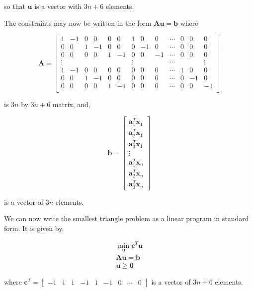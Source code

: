 \documentclass{article}
\begin{document}
\noindent so that $\mathbf{u}$ is a vector with $3n + 6$ elements.

The constraints may now be written in the form $\mathbf{A} \mathbf{u} = \mathbf{b}$ where

\begin{equation}
\mathbf{A} = \left[ \begin{smallmatrix}
1 & -1 & 0 & 0 & 0 & 0 & 1 & 0 & 0 & \cdots & 0 & 0 & 0\\
0 & 0 & 1 & -1 & 0 & 0 & 0 & -1 & 0 & \cdots & 0 & 0 & 0\\
0 & 0 & 0 & 0 & 1 & -1 & 0 & 0 & -1 & \cdots & 0 & 0 & 0\\
\vdots & & & & & & \vdots & & & \cdots & & & \vdots\\
1 & -1 & 0 & 0 & 0 & 0 & 0 & 0 & 0 & \cdots & 1 & 0 & 0\\
0 & 0 & 1 & -1 & 0 & 0 & 0 & 0 & 0 & \cdots & 0 & -1 & 0\\
0 & 0 & 0 & 0 & 1 & -1 & 0 & 0 & 0 & \cdots & 0 & 0 & -1\\
\end{smallmatrix} \right]
\end{equation}

\noindent is $3n$ by $3n+6$ matrix, and,

\begin{equation}
\mathbf{b} = \begin{bmatrix}
\mathbf{a}^T_1 \mathbf{x}_1\\
\mathbf{a}^T_2 \mathbf{x}_1\\
\mathbf{a}^T_3 \mathbf{x}_1\\
\vdots\\
\mathbf{a}^T_1 \mathbf{x}_n\\
\mathbf{a}^T_2 \mathbf{x}_n\\
\mathbf{a}^T_3 \mathbf{x}_n
\end{bmatrix}
\end{equation}

\noindent is a vector of $3n$ elements.

We can now write the smallest triangle problem as a linear program in standard form. It is given by,

\begin{eqnarray*}
\min_\mathbf{u} \mathbf{c}^T \mathbf{u}\\
\mathbf{A} \mathbf{u} = \mathbf{b}\\
\mathbf{u} \ge \mathbf{0}
\end{eqnarray*}

\noindent where $\mathbf{c}^T = \begin{bmatrix}-1 & 1 & 1 & -1 & 1 & -1 & 0 & \cdots & 0\end{bmatrix}$ is a vector of $3n + 6$ elements.
\end{document}
